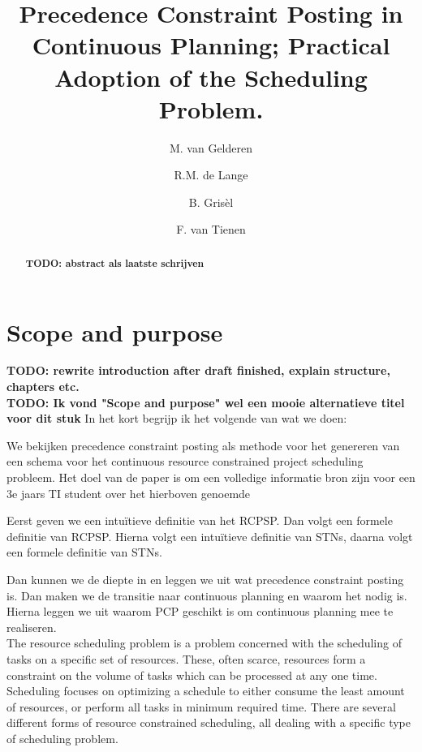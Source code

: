 \documentclass{article}
\title{Precedence Constraint Posting in Continuous Planning; Practical Adoption of the Scheduling Problem.}
\author{M. van Gelderen  \and
    R.M. de Lange \and
    B. Gris\`el \and
    F. van Tienen}
\date{}
\newcommand{\TODO}[1]{{\color{red}\textbf{TODO: #1}}}
\begin{document}
\maketitle
\thispagestyle{empty}

\begin{abstract}
\TODO{abstract als laatste schrijven}
\end{abstract}

\newpage

\section{Scope and purpose}
\TODO{rewrite introduction after draft finished, explain structure, chapters etc.}\\

\TODO{Ik vond "Scope and purpose" wel een mooie alternatieve titel voor dit stuk}
In het kort begrijp ik het volgende van wat we doen: 

We bekijken precedence constraint posting als methode voor het genereren van een schema voor het continuous resource constrained project scheduling probleem. Het doel van de paper is om een volledige informatie bron zijn voor een 3e jaars TI student over het hierboven genoemde

Eerst geven we een intuïtieve definitie van het RCPSP. Dan volgt een formele definitie van RCPSP. Hierna volgt een intuïtieve definitie van STNs, daarna volgt een formele definitie van STNs. 

Dan kunnen we de diepte in en leggen we uit wat precedence constraint posting is. Dan maken we de transitie naar continuous planning en waarom het nodig is. Hierna leggen we uit waarom PCP geschikt is om continuous planning mee te realiseren. \\



The resource scheduling problem is a problem concerned with the scheduling of tasks on a specific set of resources.
These, often scarce, resources form a constraint on the volume of tasks which can be processed at any one time.
Scheduling focuses on optimizing a schedule to either consume the least amount of resources, or perform all tasks in minimum required time.  \cite{brucker99}
There are several different forms of resource constrained scheduling, all dealing with a specific type of scheduling problem.
\end{document}
